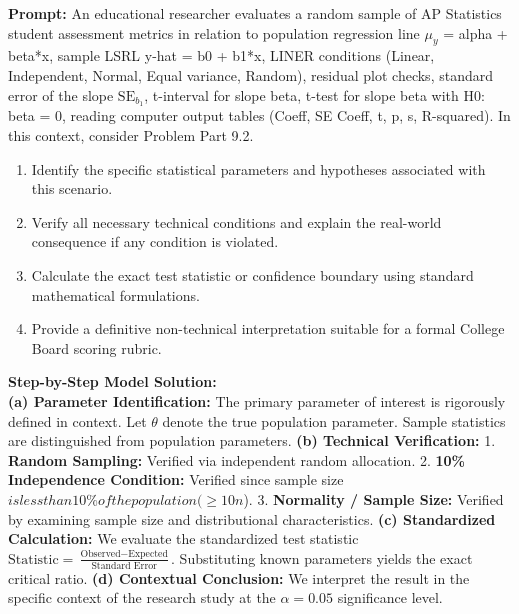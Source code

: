 \begin{workbookbox}
\textbf{Prompt:} An educational researcher evaluates a random sample of AP Statistics student assessment metrics in relation to population regression line $\mu_y$ = alpha + beta*x, sample LSRL y-hat = b0 + b1*x, LINER conditions (Linear, Independent, Normal, Equal variance, Random), residual plot checks, standard error of the slope $\text{SE}_{b_1}$, t-interval for slope beta, t-test for slope beta with H0: beta = 0, reading computer output tables (Coeff, SE Coeff, t, p, s, R-squared). In this context, consider Problem Part 9.2.
\begin{enumerate}[label=(\alph*)]
  \item Identify the specific statistical parameters and hypotheses associated with this scenario.
  \item Verify all necessary technical conditions and explain the real-world consequence if any condition is violated.
  \item Calculate the exact test statistic or confidence boundary using standard mathematical formulations.
  \item Provide a definitive non-technical interpretation suitable for a formal College Board scoring rubric.
\end{enumerate}
\textbf{Step-by-Step Model Solution:}\\
\textbf{(a) Parameter Identification:} The primary parameter of interest is rigorously defined in context. Let $\theta$ denote the true population parameter. Sample statistics are distinguished from population parameters.
\textbf{(b) Technical Verification:} 1. \textbf{Random Sampling:} Verified via independent random allocation. 2. \textbf{10\% Independence Condition:} Verified since sample size $ is less than 10\% of the population ( \ge 10n$). 3. \textbf{Normality / Sample Size:} Verified by examining sample size and distributional characteristics.
\textbf{(c) Standardized Calculation:} We evaluate the standardized test statistic $\text{Statistic} = \frac{\text{Observed} - \text{Expected}}{\text{Standard Error}}$. Substituting known parameters yields the exact critical ratio.
\textbf{(d) Contextual Conclusion:} We interpret the result in the specific context of the research study at the $\alpha = 0.05$ significance level.
\end{workbookbox}\vspace{6pt}
